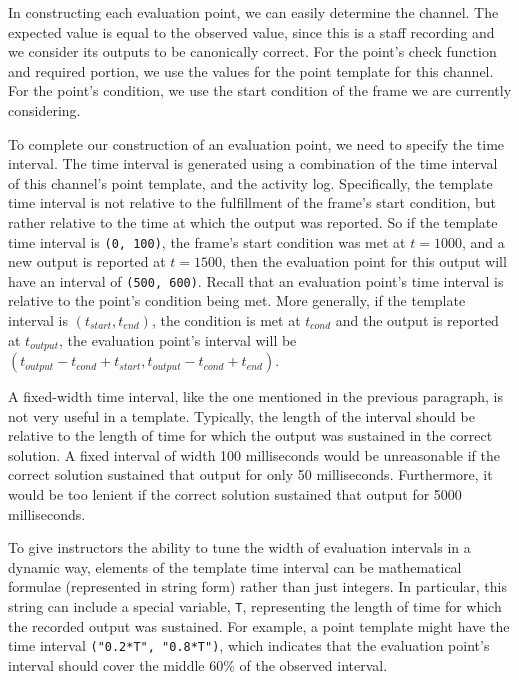 \documentclass[12pt]{article}
\begin{document}
In constructing each evaluation point, we can easily determine the channel.  The expected value is equal to the observed value, since this is a staff recording and we consider its outputs to be canonically correct.   For the point's check function and required portion, we use the values for the point template for this channel.  For the point's condition, we use the start condition of the frame we are currently considering.

To complete our construction of an evaluation point, we need to specify the time interval.  The time interval is generated using a combination of the time interval of this channel's point template, and the activity log.  Specifically, the template time interval is not relative to the fulfillment of the frame's start condition, but rather relative to the time at which the output was reported.  So if the template time interval is \texttt{(0, 100)}, the frame's start condition was met at $t=1000$, and a new output is reported at $t=1500$, then the evaluation point for this output will have an interval of \texttt{(500, 600)}.  Recall that an evaluation point's time interval is relative to the point's condition being met.  More generally, if the template interval is $(t_{start}, t_{end})$, the condition is met at $t_{cond}$ and the output is reported at $t_{output}$, the evaluation point's interval will be $(t_{output} - t_{cond} + t_{start}, t_{output} - t_{cond} + t_{end})$.

A fixed-width time interval, like the one mentioned in the previous paragraph, is not very useful in a template.  Typically, the length of the interval should be relative to the length of time for which the output was sustained in the correct solution.  A fixed interval of width 100 milliseconds would be unreasonable if the correct solution sustained that output for only 50 milliseconds.  Furthermore, it would be too lenient if the correct solution sustained that output for 5000 milliseconds.

To give instructors the ability to tune the width of evaluation intervals in a dynamic way, elements of the template time interval can be mathematical formulae (represented in string form) rather than just integers.  In particular, this string can include a special variable, \texttt{T}, representing the length of time for which the recorded output was sustained.  For example, a point template might have the time interval \texttt{("0.2*T", "0.8*T")}, which indicates that the evaluation point's interval should cover the middle 60\% of the observed interval. 
\end{document}
